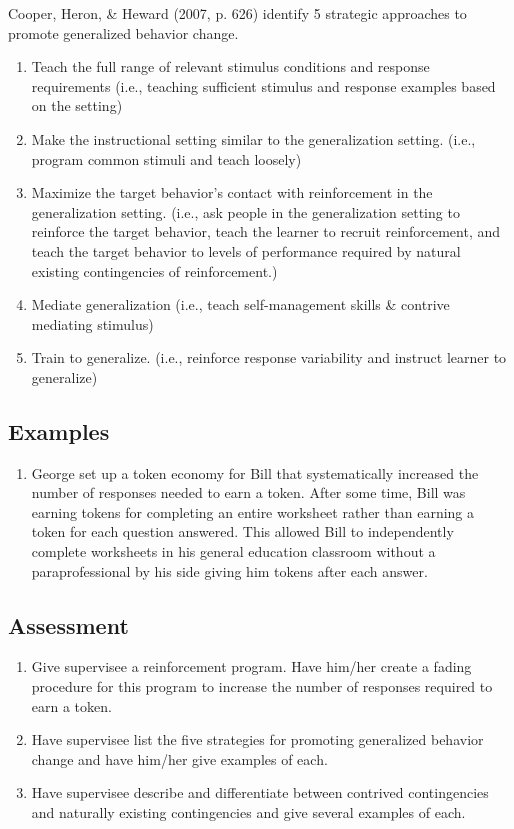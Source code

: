 Cooper, Heron, \& Heward (2007, p. 626) identify 5 strategic approaches to promote generalized behavior change.
\begin{enumerate}
\item Teach the full range of relevant stimulus conditions and response requirements (i.e., teaching sufficient stimulus and response examples based on the setting)
\item Make the instructional setting similar to the generalization setting. (i.e., program common stimuli and teach loosely)
\item Maximize the target behavior's contact with reinforcement in the generalization setting. (i.e., ask people in the generalization setting to reinforce the target behavior, teach the learner to recruit reinforcement, and teach the target behavior to levels of performance required by natural existing contingencies of reinforcement.)
\item Mediate generalization (i.e., teach self-management skills \& contrive mediating stimulus)
\item Train to generalize. (i.e., reinforce response variability and instruct learner to generalize)
\end{enumerate}
%
\subsection{Examples}
\begin{enumerate}
\item George set up a token economy for Bill that systematically increased the number of responses needed to earn a token. After some time, Bill was earning tokens for completing an entire worksheet rather than earning a token for each question answered. This allowed Bill to independently complete worksheets in his general education classroom without a paraprofessional by his side giving him tokens after each answer. 
%
\end{enumerate}
%
\subsection{Assessment}
\begin{enumerate}
\item Give supervisee a reinforcement program. Have him/her create a fading procedure for this program to increase the number of responses required to earn a token. 
\item Have supervisee list the five strategies for promoting generalized behavior change and have him/her give examples of each.
\item Have supervisee describe and differentiate between contrived contingencies and naturally existing contingencies and give several examples of each.
%
\end{enumerate}
%
